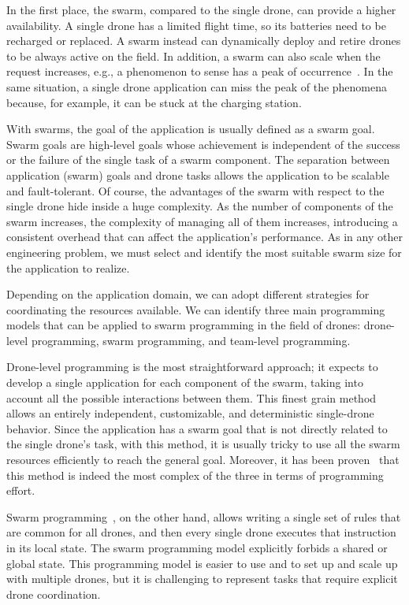 In the first place, the swarm, compared to the single drone, can provide a higher availability.
A single drone has a limited flight time, so its batteries need to be recharged or replaced. A swarm instead can dynamically 
deploy and retire drones to be always active on the field. In addition, a swarm can also scale when the request 
increases, e.g., a phenomenon to sense has a peak of occurrence~\cite{dantu2011karma}. 
In the same situation, a single drone application can miss the peak of the phenomena because, for example, it can be stuck at the charging station.

With swarms, the goal of the application is usually defined as a swarm goal.
Swarm goals are high-level goals whose achievement is independent of the success or the failure of the single task of a swarm component.
The separation between application (swarm) goals and drone tasks allows the application to be scalable and fault-tolerant.
Of course, the advantages of the swarm with respect to the single drone hide inside a huge complexity.
As the number of components of the swarm increases, the complexity of managing all of them increases, 
introducing a consistent overhead that can affect the application's performance.
As in any other engineering problem, we must select and identify the most suitable swarm size for the application to realize.

Depending on the application domain, we can adopt different strategies for coordinating the resources available.
We can identify three main programming models that can be applied to swarm programming in the field of drones: drone-level programming, swarm programming, and team-level programming.

Drone-level programming is the most straightforward approach; it expects to develop a single application for each component of the swarm, 
taking into account all the possible interactions between them. 
This finest grain method allows an entirely independent, customizable, and deterministic single-drone behavior. 
Since the application has a swarm goal that is not directly related to the single drone's task, 
with this method, it is usually tricky to use all the swarm resources efficiently to reach the general goal. 
Moreover, it has been proven~\cite{mottola2014team, dantu2011karma} that this method is indeed the most complex of the three in terms of programming effort.

Swarm programming~\cite{quigley2009ros}, on the other hand, allows writing a single set of rules that are common for all drones, and then every single drone 
executes that instruction in its local state. The swarm programming model explicitly forbids a shared or global state.
This programming model is easier to use and to set up and scale up with multiple drones, but it is challenging to represent tasks that require explicit drone coordination.

